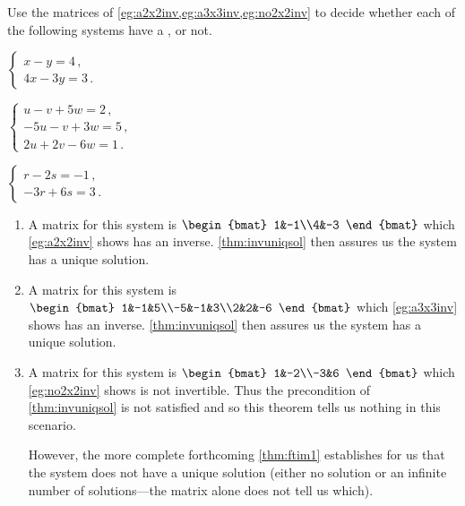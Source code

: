 \begin{example} 
Use the matrices of \cref{eg:a2x2inv,eg:a3x3inv,eg:no2x2inv} to decide whether each of the following systems have a , or not.
\begin{Parts}
\item \(\begin{cases}
x-y=4\,,\\4x-3y=3\,.
\end{cases}\)
\item \(\begin{cases}
u-v+5w=2\,,\\ -5u-v+3w=5\,,\\ 2u+2v-6w=1\,.
\end{cases}\)
\item \(\begin{cases}
r-2s=-1\,,\\-3r+6s=3\,.
\end{cases}\)
\end{Parts}
\begin{solution} 
\begin{enumerate}
\item A matrix for this system is \(\begin{bmat} 1&-1\\4&-3 \end{bmat}\) which \cref{eg:a2x2inv} shows has an inverse.  
\cref{thm:invuniqsol} then assures us the system has a unique solution.
\item A matrix for this system is \(\begin{bmat} 1&-1&5\\-5&-1&3\\2&2&-6 \end{bmat}\) which \cref{eg:a3x3inv} shows has an inverse.  
\cref{thm:invuniqsol} then assures us the system has a unique solution.
\item A matrix for this system is \(\begin{bmat} 1&-2\\-3&6 \end{bmat}\) which \cref{eg:no2x2inv} shows is not invertible.  
Thus the precondition of \cref{thm:invuniqsol} is not satisfied and so this theorem tells us nothing in this scenario.

However, the more complete forthcoming \cref{thm:ftim1} establishes for us that the system does not have a unique solution (either no solution or an infinite number of solutions---the matrix alone does not tell us which).
\end{enumerate}
\end{solution}
\end{example}






